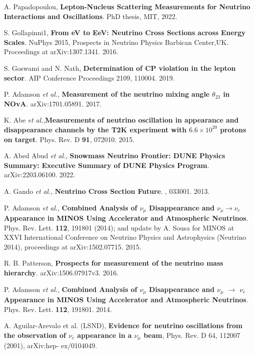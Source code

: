  A. Papadopoulou, \textbf{Lepton-Nucleus Scattering Measurements for Neutrino Interactions and Oscillations}. PhD thesis, MIT, 2022. 

 S. Gollapinni1, \textbf{From eV to EeV: Neutrino Cross Sections across Energy Scales}. NuPhys 2015, Prospects in Neutrino Physics Barbican Center,UK. Proceedings at arXiv:1307.1341. 2016.

 S. Goswami  and N. Nath, \textbf{Determination of CP violation in the lepton sector}. AIP Conference Proceedings 2109, 110004. 2019.

 P. Adamson \textit{et al.}, \textbf{Measurement of the neutrino mixing angle $\theta_{23}$ in NOvA}. arXiv:1701.05891. 2017.

 K. Abe \textit{et al.},\textbf{Measurements of neutrino oscillation in appearance and disappearance channels by the T2K experiment with $6.6 \times 10^{20} $ protons on target}. Phys. Rev. D \textbf{91}, 072010. 2015.

 A. Abed Abud \textit{et al.}, \textbf{Snowmass Neutrino Frontier: DUNE Physics Summary: Executive Summary of DUNE Physics Program}. arXiv:2203.06100. 2022.

 A. Gando \textit{et al.}, \textbf{Neutrino Cross Section Future}. , 033001. 2013.

 P. Adamson \textit{et al.}, \textbf{Combined Analysis of $\nu_\mu$ Disappearance and $\nu_\mu \rightarrow \nu_e$ Appearance in MINOS Using Accelerator and Atmospheric Neutrinos}. Phys. Rev. Lett. \textbf{112}, 191801 (2014); and update by A. Sousa for MINOS at XXVI International
Conference on Neutrino Physics and Astrophysics (Neutrino 2014), proceedings at arXiv:1502.07715. 2015.

 R. B. Patterson, \textbf{Prospects for measurement of the neutrino mass hierarchy}. arXiv:1506.07917v3. 2016.

 P. Adamson \textit{et al.}, \textbf{Combined Analysis of $\nu_\mu$ Disappearance and $\nu_\mu$ $\rightarrow $ $\nu_e$ Appearance in MINOS Using Accelerator and Atmospheric Neutrinos}. Phys. Rev. Lett. \textbf{112}, 191801. 2014.

 A. Aguilar-Arevalo et al. (LSND), \textbf{Evidence for neutrino oscillations from the observation of $\nu_e$ appearance in a $\nu_{\mu}$ beam}, Phys. Rev. D 64, 112007 (2001), arXiv:hep- ex/0104049.

